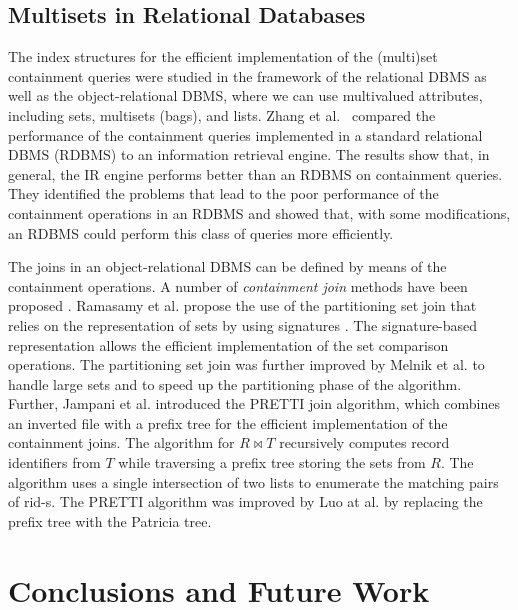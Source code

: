 \documentclass[algorithms,article,accept,pdftex,moreauthors]{Definitions/mdpi}
\begin{document}
\subsection{Multisets in Relational Databases\label{rel-dbms}}

The index structures for the efficient implementation of the (multi)set containment queries were studied in the framework of the relational DBMS as well as the object-relational DBMS, where we can use multivalued attributes, including sets, multisets (bags), and lists. Zhang et al.\ \cite{Zhang2001} compared the performance of the containment queries implemented in a standard relational DBMS (RDBMS) to an information retrieval engine. The results show that, in general, the IR engine performs better than an RDBMS on containment queries. They identified the problems that lead to the poor performance of the containment operations in an RDBMS and showed that, with some modifications, an RDBMS could perform this class of queries more efficiently. 

The joins in an object-relational DBMS can be defined by means of the containment operations. A number of \emph{containment join} methods have been proposed \cite{Ramasamy2000,Melnik2003,Jampani2005,Luo2015}. Ramasamy et al. propose the use of the partitioning set join that relies on the representation of sets by using signatures \cite{Ramasamy2000}. The signature-based representation allows the efficient implementation of the set comparison operations. The partitioning set join was further improved by Melnik et al. \cite{Melnik2003} to handle large sets and to speed up the partitioning phase of the algorithm. Further, Jampani et al. introduced the PRETTI join algorithm, which combines an inverted file with a prefix tree for the efficient implementation of the containment joins. The algorithm for $R\bowtie T$ recursively computes record identifiers from $T$ while traversing a prefix tree storing the sets from $R$. The algorithm uses a single intersection of two lists to enumerate the matching pairs of rid-s. The PRETTI algorithm was improved by Luo at al. \cite{Luo2015} by replacing the prefix tree with the Patricia tree. 

%
\section{Conclusions and Future Work} \label{c:conclusions}
\end{document}

